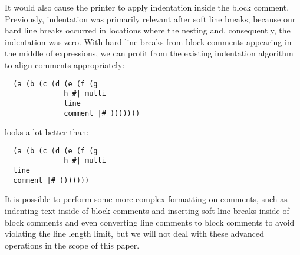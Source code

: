 It would also cause the printer to apply indentation inside the block comment.
Previously, indentation was primarily relevant after soft line breaks,
because our hard line breaks occurred in locations where the nesting and,
consequently, the indentation was zero.
With hard line breaks from block comments appearing in the middle of expressions,
we can profit from the existing indentation algorithm to align comments appropriately:
\begin{verbatim}
  (a (b (c (d (e (f (g
              h #| multi
              line
              comment |# )))))))
\end{verbatim}
looks a lot better than:
\begin{verbatim}
  (a (b (c (d (e (f (g
              h #| multi
  line
  comment |# )))))))
\end{verbatim}

It is possible to perform some more complex formatting on comments, such as
indenting text inside of block comments and
inserting soft line breaks inside of block comments and even
converting line comments to block comments to avoid violating the line length limit,
but we will not deal with these advanced operations in the scope of this paper.
